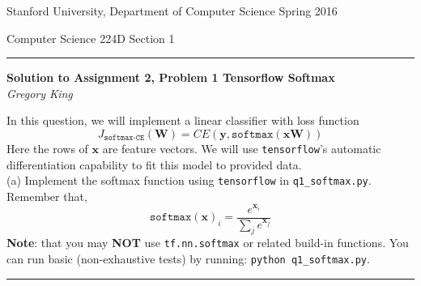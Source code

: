 \documentclass[letter,12pt]{article}
\newcommand{\myheader}[4]
{\vspace*{-0.5in}
\noindent
{#1} \hfill {#3}

\noindent
{#2} \hfill {#4}

\noindent
\rule[8pt]{\textwidth}{1pt}

\vspace{1ex} 
}  %
\newcommand{\myalgsheader}[0]
{\myheader{Stanford University, Department of Computer Science}
{Computer Science 224D}{Spring 2016}{Section 1}}
\newcommand{\myhwtitle}[3]
{\begin{center}
{\large {\bf Solution to Assignment {#1}, Problem {#2}}}\\
\medskip 
{\it {#3}} %
\end{center}}
\begin{document}
\myalgsheader

\pagestyle{plain}
\setcounter{page}{1}
\myhwtitle{2}{1 {\bf Tensorflow Softmax}}{Gregory King}

\bigskip

\noindent In this question, we will implement a linear classifier with loss function
\begin{equation}
J_{\texttt{softmax-CE}}({\textbf{W}}) = CE({\boldsymbol y}, \texttt{softmax}({\boldsymbol x}\textbf{W}))
\end{equation}
Here the rows of ${\boldsymbol x}$ are feature vectors. We will use \texttt{tensorflow}'s automatic
differentiation capability to fit this model to provided data.\\

\noindent (a) Implement the softmax function using \texttt{tensorflow} in \texttt{q1\_softmax.py}. Remember that,
\begin{equation}
\texttt{softmax}({\boldsymbol x})_{i} = \frac{e^{{\boldsymbol x}_{i}}}{\sum_{j} e^{{\boldsymbol x}_j}}
\end{equation}
\textbf{Note}: that you may \textbf{NOT} use \texttt{tf.nn.softmax} or related build-in functions. You can run basic (non-exhaustive tests) by running: \texttt{python q1\_softmax.py}.\\
\vspace{5mm}
\noindent\rule{\textwidth}{0.4pt}\vspace{5mm}
\end{document}
